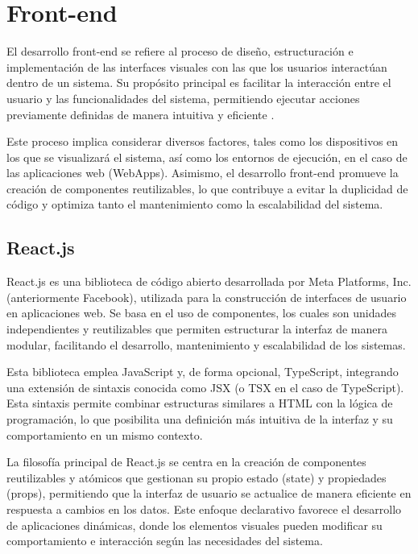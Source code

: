 \section{Front-end}

El desarrollo front-end se refiere al proceso de diseño, estructuración e implementación de las interfaces visuales con las que los usuarios interactúan dentro de un sistema. Su propósito principal es facilitar la interacción entre el usuario y las funcionalidades del sistema, permitiendo ejecutar acciones previamente definidas de manera intuitiva y eficiente \parencite{FrontentGG}.

Este proceso implica considerar diversos factores, tales como los dispositivos en los que se visualizará el sistema, así como los entornos de ejecución, en el caso de las aplicaciones web (WebApps). Asimismo, el desarrollo front-end promueve la creación de componentes reutilizables, lo que contribuye a evitar la duplicidad de código y optimiza tanto el mantenimiento como la escalabilidad del sistema.



\subsection{React.js}

React.js es una biblioteca de código abierto desarrollada por Meta Platforms, Inc. (anteriormente Facebook), utilizada para la construcción de interfaces de usuario en aplicaciones web. Se basa en el uso de componentes, los cuales son unidades independientes y reutilizables que permiten estructurar la interfaz de manera modular, facilitando el desarrollo, mantenimiento y escalabilidad de los sistemas.

Esta biblioteca emplea JavaScript y, de forma opcional, TypeScript, integrando una extensión de sintaxis conocida como JSX (o TSX en el caso de TypeScript). Esta sintaxis permite combinar estructuras similares a HTML con la lógica de programación, lo que posibilita una definición más intuitiva de la interfaz y su comportamiento en un mismo contexto.

La filosofía principal de React.js se centra en la creación de componentes reutilizables y atómicos que gestionan su propio estado (state) y propiedades (props), permitiendo que la interfaz de usuario se actualice de manera eficiente en respuesta a cambios en los datos. Este enfoque declarativo favorece el desarrollo de aplicaciones dinámicas, donde los elementos visuales pueden modificar su comportamiento e interacción según las necesidades del sistema.

